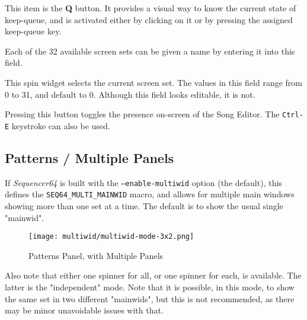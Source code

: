    This item is the \textbf{Q} button.
   It provides a visual way to know the current state of keep-queue, and is
   activated either by clicking on it or by pressing the assigned keep-queue
   key.

   Each of the 32 available screen sets can be given a name by entering it
   into this field.

%

   This spin widget selects the current screen set.  The values in this
   field range from 0 to 31, and default to 0.
   Although this field looks editable, it is not.

%

   Pressing this button toggles the presence on-screen of the Song
   Editor.  The \texttt{Ctrl-E} keystroke can also be used.

\subsection{Patterns / Multiple Panels}
\label{subsec:seq64_patterns_panel_multiple}

   If \textsl{Sequencer64} is built with the \texttt{--enable-multiwid}
   option (the default), this defines the 
   \texttt{SEQ64\_MULTI\_MAINWID} macro, and allows for
    multiple main windows showing more than one set at a time.
   The default is to show the usual single "mainwid".

\begin{figure}[H]
   \centering 
   \texttt{[image: multiwid/multiwid-mode-3x2.png]}
   \caption{Patterns Panel, with Multiple Panels}
   \label{fig:pattern_window_bottom_panel_multiple}
\end{figure}

   Also note that either one spinner for all, or one spinner for each, is
   available.  The latter is the "independent" mode.
   Note that it is possible, in this mode, to show the same set in two
   different "mainwids", but this is not recommended, as there may be minor
   unavoidable issues with that.

